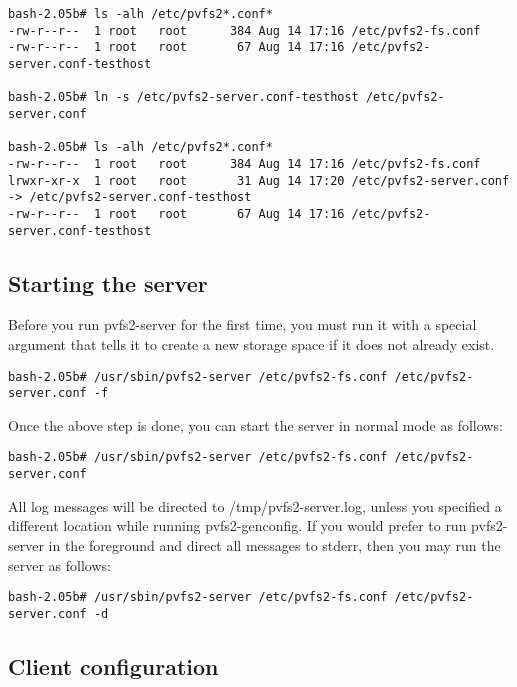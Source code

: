 \documentclass[11pt, letterpaper]{article}
\begin{document}
\begin{verbatim}
bash-2.05b# ls -alh /etc/pvfs2*.conf*
-rw-r--r--  1 root   root      384 Aug 14 17:16 /etc/pvfs2-fs.conf
-rw-r--r--  1 root   root       67 Aug 14 17:16 /etc/pvfs2-server.conf-testhost

bash-2.05b# ln -s /etc/pvfs2-server.conf-testhost /etc/pvfs2-server.conf

bash-2.05b# ls -alh /etc/pvfs2*.conf*
-rw-r--r--  1 root   root      384 Aug 14 17:16 /etc/pvfs2-fs.conf
lrwxr-xr-x  1 root   root       31 Aug 14 17:20 /etc/pvfs2-server.conf -> /etc/pvfs2-server.conf-testhost
-rw-r--r--  1 root   root       67 Aug 14 17:16 /etc/pvfs2-server.conf-testhost

\end{verbatim}

\subsection{Starting the server}

Before you run pvfs2-server for the first time, you must run it with a special 
argument that tells it to create a new storage space if it does not already 
exist.

\begin{verbatim}
bash-2.05b# /usr/sbin/pvfs2-server /etc/pvfs2-fs.conf /etc/pvfs2-server.conf -f
\end{verbatim}

Once the above step is done, you can start the server in normal mode 
as follows:

\begin{verbatim}
bash-2.05b# /usr/sbin/pvfs2-server /etc/pvfs2-fs.conf /etc/pvfs2-server.conf
\end{verbatim}

All log messages will be directed to /tmp/pvfs2-server.log, unless you specified
a different location while running pvfs2-genconfig.  If you would prefer to run 
pvfs2-server in the foreground and direct all messages to stderr, then 
you may run the server as follows:

\begin{verbatim}
bash-2.05b# /usr/sbin/pvfs2-server /etc/pvfs2-fs.conf /etc/pvfs2-server.conf -d
\end{verbatim}

\subsection{Client configuration}
\end{document}
